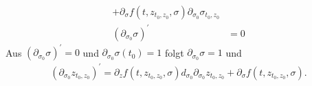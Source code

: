\begin{solution}
\begin{enumerate}[label = \textbf{\alph*)}]
\begin{align*}
  + \partial_{\sigma} f(t,z_{t_0,z_0},\sigma) \partial_{\sigma_0} \sigma_{t_0,z_0} \\
  (\partial_{\sigma_0} \sigma)^{\prime} &= 0
\end{align*}
Aus $(\partial_{\sigma_0} \sigma)^{\prime} = 0$ und $\partial_{\sigma_0}\sigma(t_0) = 1$
folgt $\partial_{\sigma_0} \sigma = 1$ und
\begin{align*}
  (\partial_{\sigma_0}z_{t_0,z_0})^{\prime} =
  \partial_z f(t,z_{t_0,z_0},\sigma)d_{\sigma_0}\partial_{\sigma_0} z_{t_0,z_0}
  + \partial_\sigma f(t,z_{t_0,z_0},\sigma).
\end{align*}
\end{enumerate}
\end{solution}
